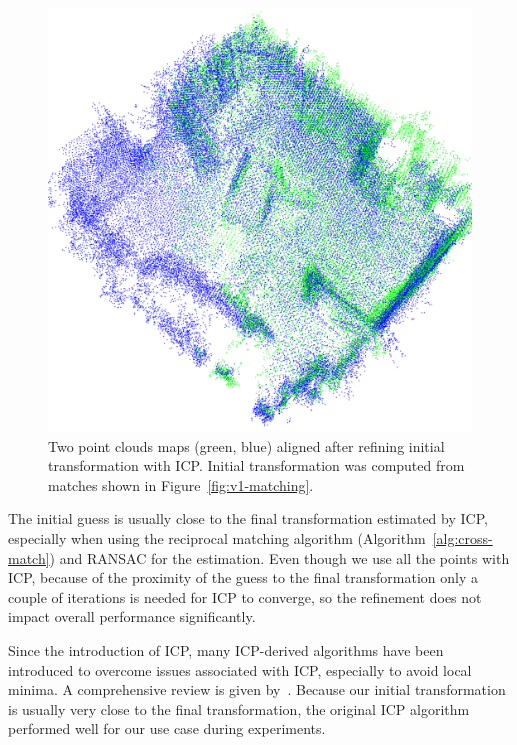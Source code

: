 \begin{figure}
    \centering
    \includegraphics[width=\textwidth]{../img/v1-refined.png}
    \caption[Aligned point clouds]{Two point clouds maps (green, blue) aligned after refining initial transformation with \gls{ICP}. Initial transformation was computed from matches shown in Figure~\ref{fig:v1-matching}.}
    \label{fig:v1-refined}
\end{figure}

The initial guess is usually close to the final transformation estimated by \gls{ICP}, especially when using the reciprocal matching algorithm (Algorithm~\ref{alg:cross-match}) and \gls{RANSAC} for the estimation. Even though we use all the points with \gls{ICP}, because of the proximity of the guess to the final transformation only a couple of iterations is needed for \gls{ICP} to converge, so the refinement does not impact overall performance significantly.

Since the introduction of \gls{ICP}, many \gls{ICP}-derived algorithms have been introduced to overcome issues associated with \gls{ICP}, especially to avoid local minima. A comprehensive review is given by~\citet{pomerleau2015reviewregistration}. Because our initial transformation is usually very close to the final transformation, the original \gls{ICP} algorithm performed well for our use case during experiments.


